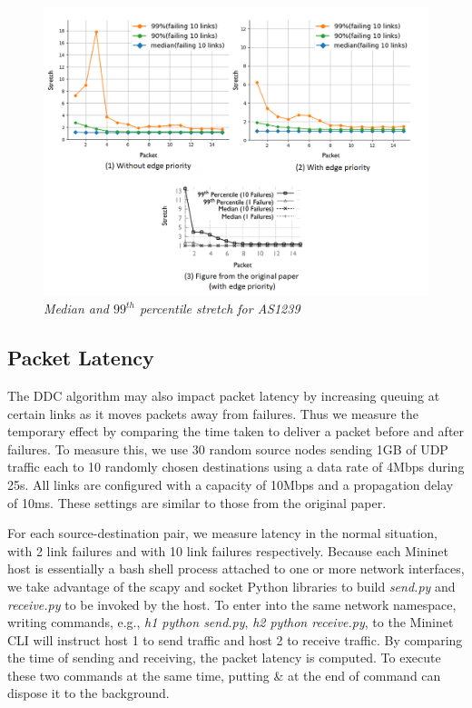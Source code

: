 \begin{figure}[H]
      \centering \includegraphics[scale=0.58]{pictures/pathStretch.png}
      \caption{\it{Median and $99^{th}$ percentile stretch for AS1239}}
      \label{fig:pathStretch}
\end{figure}

\subsection{Packet Latency}
The DDC algorithm may also impact packet latency by increasing queuing at certain links as it moves packets away from failures. 
Thus we measure the temporary effect by comparing the time taken to deliver a packet before and after failures. 
To measure this, we use 30 random source nodes sending 1GB of UDP traffic each to 10 randomly chosen destinations using a data rate of 4Mbps  during 25s. 
All links are configured with a capacity of 10Mbps and a propagation delay of 10ms.
These settings are similar to those from the original paper.

For each source-destination pair, we measure latency in the normal situation, with 2 link failures and with 10 link failures respectively. 
Because each Mininet host is essentially a bash shell process attached to one or more network interfaces, we take advantage of the scapy and socket Python libraries to build \textit{send.py} and \textit{receive.py} to be invoked by the host. 
To enter into the same network namespace, writing commands, e.g., \textit{h1 python send.py}, \textit{h2 python receive.py}, to the Mininet CLI will instruct host 1 to send traffic and host 2 to receive traffic. 
By comparing the time of sending and receiving, the packet latency is computed. To execute these two commands at the same time, putting \& at the end of command can dispose it to the background.

